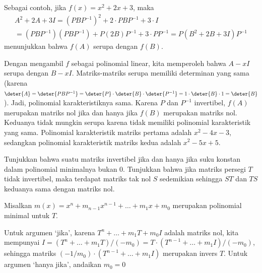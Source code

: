 \begin{exercises}
\begin{answer}
       Sebagai contoh, jika $f(x)=x^2+2x+3$, maka
       \begin{multline*}
         A^2+2A+3I=(PBP^{-1})^2+2\cdot PBP^{-1}+3\cdot I           \\
                  =(PBP^{-1})(PBP^{-1})+P(2B)P^{-1}+3\cdot PP^{-1}
                  =P(B^2+2B+3I)P^{-1}
       \end{multline*}
       menunjukkan bahwa $f(A)$ serupa dengan $f(B)$.
       \begin{exparts}
         \partsitem Dengan mengambil $f$ sebagai polinomial linear, kita memperoleh bahwa
           $A-xI$ serupa dengan $B-xI$.
           Matriks-matriks serupa memiliki determinan yang sama (karena
           $\deter{A}=\deter{PBP^{-1}}
               =\deter{P}\cdot\deter{B}\cdot\deter{P^{-1}}
               =1\cdot\deter{B}\cdot 1=\deter{B}$).
           Jadi, polinomial karakteristiknya sama.
         \partsitem 
           Karena \( P \) dan \( P^{-1} \) invertibel, \( f(A) \) merupakan
           matriks nol jika dan hanya jika \( f(B) \) merupakan matriks nol.
         \partsitem Keduanya tidak mungkin serupa karena tidak memiliki
           polinomial karakteristik yang sama.
           Polinomial karakteristik matriks pertama adalah
           $x^2-4x-3$, sedangkan polinomial karakteristik matriks
           kedua adalah $x^2-5x+5$.
       \end{exparts}  
     \end{answer}
   \item 
    \begin{exparts}
     \partsitem Tunjukkan bahwa suatu matriks invertibel jika dan hanya jika
       suku konstan
       dalam polinomial minimalnya bukan $0$.
     \partsitem Tunjukkan bahwa jika matriks persegi \( T \) tidak invertibel,
       maka terdapat
       matriks tak nol \( S \) sedemikian sehingga \( ST \) dan \( TS \) keduanya
       sama dengan matriks nol.
     \end{exparts}
     \begin{answer}
      Misalkan \( m(x)=x^n+m_{n-1}x^{n-1}+\dots+m_1x+m_0 \)
      merupakan polinomial minimal untuk \( T \).
      \begin{exparts}
       \partsitem 
         Untuk argumen `jika',
         karena \( T^n+\dots+m_1T+m_0I \) adalah matriks nol, kita
         mempunyai \( I=(T^n+\dots+m_1T)/(-m_0)=
         T\cdot (T^{n-1}+\dots+m_1I)/(-m_0) \), sehingga
         matriks $(-1/m_0)\cdot (T^{n-1}+\dots+m_1I)$ merupakan invers $T$.
         Untuk argumen `hanya jika', andaikan \( m_0=0 \)

\end{exparts}
\end{answer}
\end{exercises}
